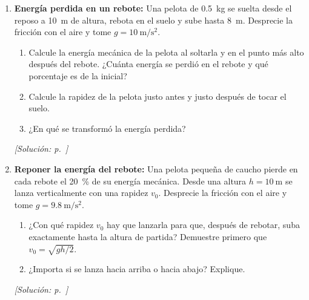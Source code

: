 \begin{enumerate}[label=\textbf{P\arabic*.}, ref=P\arabic*, leftmargin=*]
    \begin{enumerate}
        \item Calcule la rapidez del carro en $B$, el punto más bajo, y en la
        cima $C$.
        \item ¿Llega el carro hasta $E$, a \SI{22}{\meter}? ¿Cuál es la altura
        máxima que puede tener una colina para que el carro la supere?
        \item ¿Cambian las respuestas anteriores si el carro va lleno y tiene
        el doble de masa? Explique.
    \end{enumerate}
    \hfill\textit{[Solución: p.~\pageref{sol:parcial2-montana}]}

    \item\label{prob:parcial2-rebote} \textbf{Energía perdida en un rebote:}
    Una pelota de \SI{0.5}{\kilogram} se suelta desde el reposo a
    \SI{10}{\meter} de altura, rebota en el suelo y sube hasta
    \SI{8}{\meter}. Desprecie la fricción con el aire y tome
    $g = \SI{10}{\meter\per\second\squared}$.
    \begin{enumerate}
        \item Calcule la energía mecánica de la pelota al soltarla y en el
        punto más alto después del rebote. ¿Cuánta energía se perdió en el
        rebote y qué porcentaje es de la inicial?
        \item Calcule la rapidez de la pelota justo antes y justo después de
        tocar el suelo.
        \item ¿En qué se transformó la energía perdida?
    \end{enumerate}
    \hfill\textit{[Solución: p.~\pageref{sol:parcial2-rebote}]}

    \item\label{prob:parcial2-lanzamiento} \textbf{Reponer la energía del
    rebote:} Una pelota pequeña de caucho pierde en cada rebote el
    \SI{20}{\percent} de su energía mecánica. Desde una altura
    $h = \SI{10}{\meter}$ se lanza verticalmente con una rapidez $v_0$.
    Desprecie la fricción con el aire y tome
    $g = \SI{9.8}{\meter\per\second\squared}$.
    \begin{enumerate}
        \item ¿Con qué rapidez $v_0$ hay que lanzarla para que, después de
        rebotar, suba exactamente hasta la altura de partida? Demuestre
        primero que $v_0 = \sqrt{gh/2}$.
        \item ¿Importa si se lanza hacia arriba o hacia abajo? Explique.
    \end{enumerate}
    \hfill\textit{[Solución: p.~\pageref{sol:parcial2-lanzamiento}]}


\end{enumerate}

